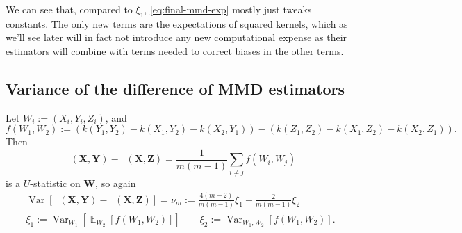 \documentclass{article}
\DeclareMathOperator{\E}{\mathbb{E}}
\DeclareMathOperator{\Var}{Var}
\DeclareMathOperator{\mmdsqu}{\widehat{MMD}_U^2}
\newcommand{\setX}{\mathbf{X}}
\newcommand{\setY}{\mathbf{Y}}
\newcommand{\setZ}{\mathbf{Z}}
\newcommand{\setW}{\mathbf{W}}
\begin{document}
We can see that, compared to $\xi_1$,
\eqref{eq:final-mmd-exp} mostly just tweaks constants.
The only new terms are the expectations of squared kernels,
which as we'll see later will in fact not introduce any new computational expense
as their estimators will combine with terms needed to correct biases in the other terms.


\subsection{Variance of the difference of MMD estimators} \label{sec:diff-expression}

Let $W_i := (X_i, Y_i, Z_i)$, and
\[
f(W_1, W_2) := 
\left( k(Y_1, Y_2) - k(X_1, Y_2) - k(X_2, Y_1) \right)
- \left( k(Z_1, Z_2) - k(X_1, Z_2) - k(X_2, Z_1) \right)
.\]
Then
\[
  \mmdsqu(\setX, \setY) - \mmdsqu(\setX, \setZ)
  = \frac{1}{m (m-1)} \sum_{i \ne j} f(W_i, W_j)
\]
is a $U$-statistic on $\setW$, so again
\begin{gather*}
  \Var[\mmdsqu(\setX, \setY) - \mmdsqu(\setX, \setZ)]
  = \nu_m
  := \frac{4 (m-2)}{m (m-1)} \xi_1 + \frac{2}{m (m-1)} \xi_2
\\
  \xi_1 := \Var_{W_1}\left[ \E_{W_2}\left[ f(W_1, W_2) \right] \right]
  \qquad
  \xi_2 := \Var_{W_1, W_2}\left[ f(W_1, W_2) \right]
.\end{gather*}
\end{document}
